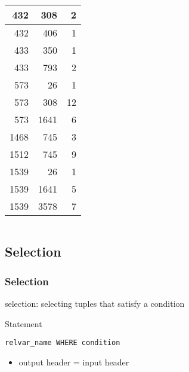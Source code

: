 \documentclass[dvipsnames]{beamer}
\theoremstyle{plain}
\begin{document}
\begin{frame}
\begin{example}[CASTING]
\begin{columns}[b]
      \begin{tiny}
      \begin{table}
        \begin{tabular}{|r|r|r|}\hline
    432 &     308 &   2\\\hline
    432 &     406 &   1\\\hline
    433 &     350 &   1\\\hline
    433 &     793 &   2\\\hline
    573 &      26 &   1\\\hline
    573 &     308 &  12\\\hline
    573 &    1641 &   6\\\hline
   1468 &     745 &   3\\\hline
   1512 &     745 &   9\\\hline
   1539 &      26 &   1\\\hline
   1539 &    1641 &   5\\\hline
   1539 &    3578 &   7\\\hline
        \end{tabular}
      \end{table}
      \end{tiny}
    \end{columns}
  \end{example}
\end{frame}

\subsection{Selection}

\begin{frame}[fragile]
  \frametitle{Selection}

  \begin{definition}
    \alert{selection}: selecting tuples that satisfy a condition
  \end{definition}

  \pause
  \begin{block}{Statement}
    \begin{lstlisting}
relvar_name WHERE condition
    \end{lstlisting}
  \end{block}

  \pause
  \begin{itemize}
    \item output header = input header
  \end{itemize}
\end{frame}
\end{document}
